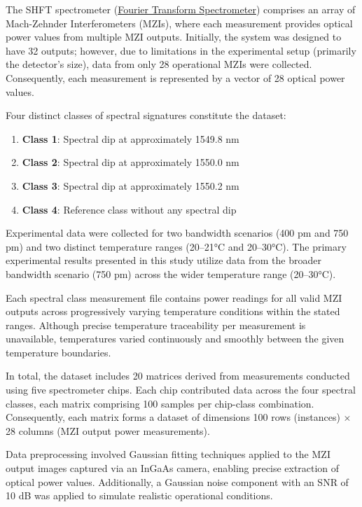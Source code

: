 The SHFT spectrometer (\href{https://www.rp-photonics.com/fourier_transform_spectroscopy.html}{Fourier Transform Spectrometer}) comprises an array of Mach-Zehnder Interferometers (MZIs), where each measurement provides optical power values from multiple MZI outputs. Initially, the system was designed to have 32 outputs; however, due to limitations in the experimental setup (primarily the detector’s size), data from only 28 operational MZIs were collected. Consequently, each measurement is represented by a vector of 28 optical power values.

Four distinct classes of spectral signatures constitute the dataset:

\begin{enumerate}
    \item \textbf{Class 1}: Spectral dip at approximately 1549.8 nm
    \item \textbf{Class 2}: Spectral dip at approximately 1550.0 nm
    \item \textbf{Class 3}: Spectral dip at approximately 1550.2 nm
    \item \textbf{Class 4}: Reference class without any spectral dip
\end{enumerate}

Experimental data were collected for two bandwidth scenarios (400 pm and 750 pm) and two distinct temperature ranges (20–21°C and 20–30°C). The primary experimental results presented in this study utilize data from the broader bandwidth scenario (750 pm) across the wider temperature range (20–30°C).

Each spectral class measurement file contains power readings for all valid MZI outputs across progressively varying temperature conditions within the stated ranges. Although precise temperature traceability per measurement is unavailable, temperatures varied continuously and smoothly between the given temperature boundaries.

In total, the dataset includes 20 matrices derived from measurements conducted using five spectrometer chips. Each chip contributed data across the four spectral classes, each matrix comprising 100 samples per chip-class combination. Consequently, each matrix forms a dataset of dimensions 100 rows (instances) × 28 columns (MZI output power measurements).

Data preprocessing involved Gaussian fitting techniques applied to the MZI output images captured via an InGaAs camera, enabling precise extraction of optical power values. Additionally, a Gaussian noise component with an SNR of 10 dB was applied to simulate realistic operational conditions.

